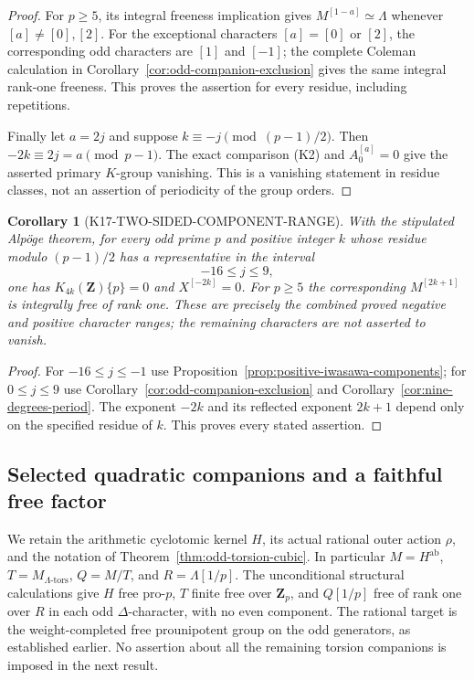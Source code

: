 \documentclass[11pt,a4paper]{article}
\newtheorem{corollary}[theorem]{Corollary}
\theoremstyle{definition}
\begin{document}
\begin{proof}
For $p\geq5$, its integral freeness implication gives
$M^{[1-a]}\simeq\Lambda$ whenever $[a]\ne[0],[2]$.
For the exceptional characters $[a]=[0]$ or $[2]$, the
corresponding odd characters are $[1]$ and $[-1]$; the complete
Coleman calculation in Corollary~\ref{cor:odd-companion-exclusion}
gives the same integral rank-one freeness. This proves the
assertion for every residue, including repetitions.

Finally let $a=2j$ and suppose
$k\equiv-j\pmod{(p-1)/2}$. Then
$-2k\equiv2j=a\pmod{p-1}$. The exact comparison (K2)
and $A_0^{[a]}=0$ give the asserted primary $K$-group
vanishing. This is a vanishing statement in residue classes,
not an assertion of periodicity of the group orders.
\end{proof}

\begin{corollary}[K17-TWO-SIDED-COMPONENT-RANGE]
\label{cor:two-sided-component-range}
With the stipulated Alp\"oge theorem, for every odd prime $p$
and positive integer $k$ whose residue modulo $(p-1)/2$
has a representative in the interval
\[
                              -16\leq j\leq9,
 \tag{PC.4}
\]
one has $K_{4k}(\mathbf Z)\{p\}=0$ and
$X^{[-2k]}=0$. For $p\geq5$ the corresponding
$M^{[2k+1]}$ is integrally free of rank one. These are precisely
the combined proved negative and positive character ranges;
the remaining characters are not asserted to vanish.
\end{corollary}

\begin{proof}
For $-16\leq j\leq-1$ use
Proposition~\ref{prop:positive-iwasawa-components}; for
$0\leq j\leq9$ use Corollary~\ref{cor:odd-companion-exclusion}
and Corollary~\ref{cor:nine-degrees-period}. The exponent
$-2k$ and its reflected exponent $2k+1$ depend only on the
specified residue of $k$. This proves every stated assertion.
\end{proof}

\subsection{Selected quadratic companions and a faithful free factor}
\label{sec:selected-pair-faithfulness}

We retain the arithmetic cyclotomic kernel $H$, its actual rational
outer action $\rho$, and the notation of
Theorem~\ref{thm:odd-torsion-cubic}. In particular
$M=H^{\mathrm{ab}}$, $T=M_{\Lambda\text{-tors}}$,
$Q=M/T$, and $R=\Lambda[1/p]$. The unconditional structural
calculations give $H$ free pro-$p$, $T$ finite free over
$\mathbf Z_p$, and $Q[1/p]$ free of rank one over $R$ in each
odd $\Delta$-character, with no even component. The rational
target is the weight-completed free prounipotent group on the
odd generators, as established earlier. No assertion about all
the remaining torsion companions is imposed in the next result.
\end{document}
